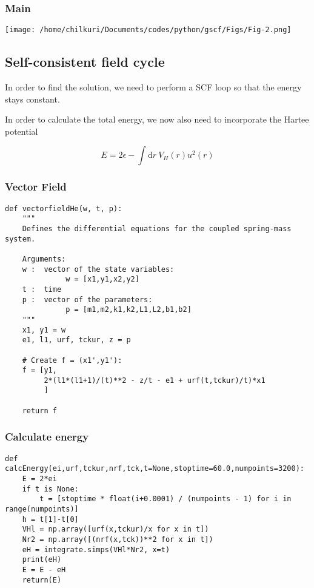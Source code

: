 \documentclass[11pt,a4paper]{article}
\begin{document}
\subsubsection{Main}
\label{sec:org700d4cb}
\begin{center}
\texttt{[image: /home/chilkuri/Documents/codes/python/gscf/Figs/Fig-2.png]}
\end{center}

\subsection{Self-consistent field cycle}
\label{sec:org9a9134e}

In order to find the solution, we need to perform a SCF loop
so that the energy stays constant.

In order to calculate the total energy, we now also need to
incorporate the Hartee potential

\[
E = 2 \epsilon - \int \text{d}r\ V_H(r) u^2(r)
\]


\subsubsection{Vector Field}
\label{sec:org287d26f}
\begin{verbatim}
def vectorfieldHe(w, t, p):
    """
    Defines the differential equations for the coupled spring-mass system.

    Arguments:
    w :  vector of the state variables:
              w = [x1,y1,x2,y2]
    t :  time
    p :  vector of the parameters:
              p = [m1,m2,k1,k2,L1,L2,b1,b2]
    """
    x1, y1 = w
    e1, l1, urf, tckur, z = p

    # Create f = (x1',y1'):
    f = [y1,
         2*(l1*(l1+1)/(t)**2 - z/t - e1 + urf(t,tckur)/t)*x1
         ]

    return f
\end{verbatim}
\subsubsection{Calculate energy}
\label{sec:org7d17dc6}
\begin{verbatim}
def calcEnergy(ei,urf,tckur,nrf,tck,t=None,stoptime=60.0,numpoints=3200):
    E = 2*ei
    if t is None:
        t = [stoptime * float(i+0.0001) / (numpoints - 1) for i in range(numpoints)]
    h = t[1]-t[0]
    VHl = np.array([urf(x,tckur)/x for x in t])
    Nr2 = np.array([(nrf(x,tck))**2 for x in t])
    eH = integrate.simps(VHl*Nr2, x=t)
    print(eH)
    E = E - eH
    return(E)
\end{verbatim}
\end{document}
